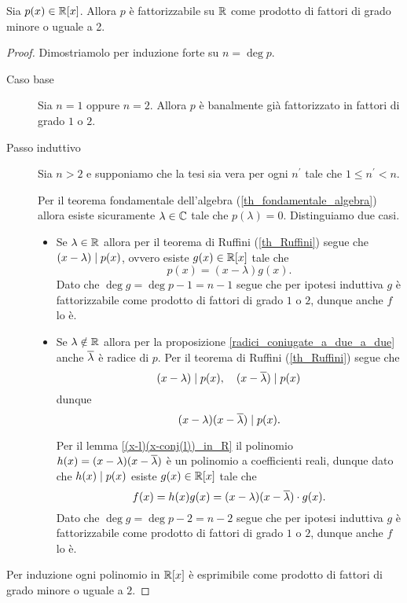 \begin{proposition}
    Sia $p(x) \in \mathbb{R}[x]$. Allora $p$ è fattorizzabile su $\mathbb{R}$ come prodotto di fattori di grado minore o uguale a 2.
\end{proposition}
\begin{proof}
    Dimostriamolo per induzione forte su $n = \deg p$.

    \begin{description}
        \item[Caso base] Sia $n = 1$ oppure $n = 2$. Allora $p$ è banalmente già fattorizzato in fattori di grado $1$ o $2$.
        \item[Passo induttivo] Sia $n > 2$ e supponiamo che la tesi sia vera per ogni $n^\prime$ tale che $1 \leq n^\prime < n$.
        
        Per il teorema fondamentale dell'algebra (\ref{th_fondamentale_algebra}) allora esiste sicuramente $\lambda \in \mathbb{C}$ tale che $p(\lambda) = 0$. Distinguiamo due casi.
        \begin{itemize}
            \item Se $\lambda \in \mathbb{R}$ allora per il teorema di Ruffini (\ref{th_Ruffini}) segue che $(x-\lambda) \mid p(x)$, ovvero esiste $g(x) \in \mathbb{R}[x]$ tale che \[
                p(x) = (x-\lambda)g(x).    
            \] Dato che $\deg g = \deg p - 1 = n - 1$ segue che per ipotesi induttiva $g$ è fattorizzabile come prodotto di fattori di grado $1$ o $2$, dunque anche $f$ lo è.
            \item Se $\lambda \notin \mathbb{R}$ allora per la proposizione \ref{radici_coniugate_a_due_a_due} anche $\overline{\lambda}$ è radice di $p$. Per il teorema di Ruffini (\ref{th_Ruffini}) segue che \[
                (x-\lambda) \mid p(x),\quad (x - \overline{\lambda}) \mid p(x)
            \] dunque \[
                (x-\lambda)(x-\overline{\lambda}) \mid p(x).
            \]

            Per il lemma \ref{(x-l)(x-conj(l))_in_R} il polinomio $h(x) = (x-\lambda)(x-\overline{\lambda})$ è un polinomio a coefficienti reali, dunque dato che $h(x) \mid p(x)$ esiste $g(x) \in \mathbb{R}[x]$ tale che \[
                f(x) = h(x)g(x) = (x-\lambda)(x-\overline{\lambda}) \cdot g(x).  
            \] Dato che $\deg g = \deg p - 2 = n - 2$ segue che per ipotesi induttiva $g$ è fattorizzabile come prodotto di fattori di grado $1$ o $2$, dunque anche $f$ lo è.
        \end{itemize}
    \end{description}

    Per induzione ogni polinomio in $\mathbb{R}[x]$ è esprimibile come prodotto di fattori di grado minore o uguale a $2$.
\end{proof}

